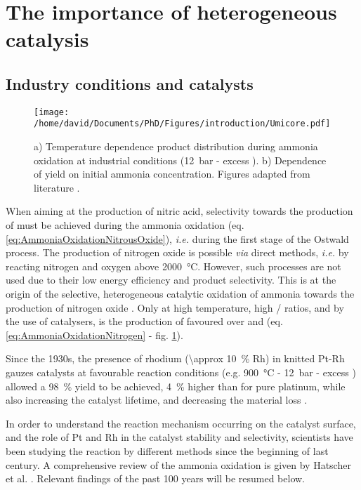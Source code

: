 \section{The importance of heterogeneous catalysis}\label{sec:AmoOxiHC}

\subsection{Industry conditions and catalysts}

\begin{figure}[!htb]
    \centering
    \texttt{[image: /home/david/Documents/PhD/Figures/introduction/Umicore.pdf]}
    \caption{
    a) Temperature dependence product distribution during ammonia oxidation at industrial conditions (\qty{12}{\bar} - excess ).
    b) Dependence of  yield on initial ammonia concentration.
    Figures adapted from literature \parencite{Heck1982, Hatscher2008}.
    }
    \label{fig:Products}
\end{figure}

When aiming at the production of nitric acid, selectivity towards the production of  must be achieved during the ammonia oxidation (eq. \ref{eq:AmmoniaOxidationNitrousOxide}), \textit{i.e.} during the first stage of the Ostwald process.
The production of nitrogen oxide is possible \textit{via} direct methods, \textit{i.e.} by reacting nitrogen and oxygen above \qty{2000}{\degreeCelsius}.
However, such processes are not used due to their low energy efficiency and product selectivity.
This is at the origin of the selective, heterogeneous catalytic oxidation of ammonia towards the production of nitrogen oxide \parencite{Hatscher2008}.
Only at high temperature, high / ratios, and by the use of catalysers, is the production of  favoured over  and  (eq. \ref{eq:AmmoniaOxidationNitrogen} - fig. \ref{fig:Products}).

Since the 1930s, the presence of rhodium (\qty{\approx 10}{\percent} Rh) in knitted Pt-Rh gauzes catalysts at favourable reaction conditions (e.g. \qty{900}{\degreeCelsius} - \qty{12}{\bar} - excess ) allowed a \qty{98}{\percent}  yield to be achieved, \qty{4}{\percent} higher than for pure platinum, while also increasing the catalyst lifetime, and decreasing the material loss \parencite{Kaiser1909, Handforth1934, Heck1982, Hatscher2008}.

In order to understand the reaction mechanism occurring on the catalyst surface, and the role of Pt and Rh in the catalyst stability and selectivity, scientists have been studying the reaction by different methods since the beginning of last century.
A comprehensive review of the ammonia oxidation is given by Hatscher et al. \parencite*{Hatscher2008}.
Relevant findings of the past 100 years will be resumed below.

